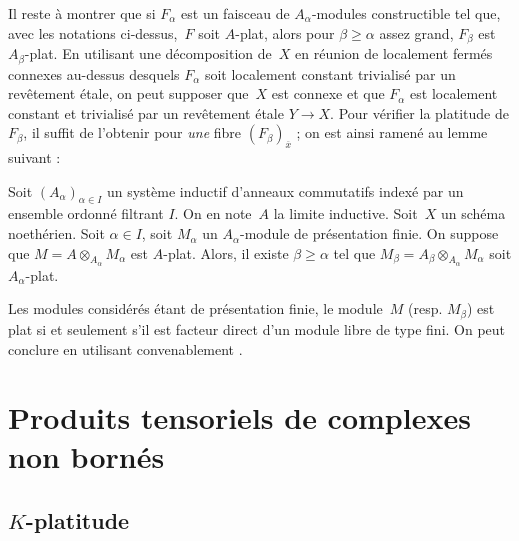 \documentclass[10pt]{../fichiers-configuration-latex/smfart}
\begin{document}
Il reste à montrer que si $F_\alpha$ est un faisceau de $A_\alpha$-modules
constructible tel que, avec les notations ci-dessus, $F$ soit $A$-plat,
alors pour $\beta\geq \alpha$ assez grand, $F_\beta$ est $A_\beta$-plat. En
utilisant une décomposition de $X$ en réunion de localement fermés connexes
au-dessus desquels $F_\alpha$ soit localement constant trivialisé par un
revêtement étale, on peut supposer que $X$ est connexe et que
$F_\alpha$ est localement constant et trivialisé par un revêtement étale
$Y\to X$. Pour vérifier la platitude de $F_\beta$, il suffit de l'obtenir
pour \emph{une} fibre $(F_\beta)_{\overline x}$ ; on est ainsi ramené au
lemme suivant :

\begin{lemme2}
Soit $(A_\alpha)_{\alpha\in I}$ un système inductif d'anneaux commutatifs
indexé par un ensemble ordonné filtrant $I$. On en note $A$ la limite
inductive. Soit $X$ un schéma noethérien. Soit $\alpha\in I$, soit
$M_\alpha$ un $A_\alpha$-module de présentation finie. On suppose que
$M=A\otimes_{A_\alpha} M_\alpha$ est $A$-plat. Alors, il existe $\beta\geq
\alpha$ tel que $M_\beta=A_\beta\otimes_{A_\alpha} M_\alpha$ soit
$A_\alpha$-plat.
\end{lemme2}

Les modules considérés étant de présentation finie, le module $M$ (resp.
$M_\beta$) est plat si et seulement s'il est facteur direct d'un module
libre de type fini. On peut conclure en utilisant convenablement
.


\ifx\danslelivre\undefined
\appendix
\fi


\section{Produits tensoriels de complexes non bornés}%
\subsection{\texorpdfstring{$K$-platitude}{K-platitude}}%
\end{document}
